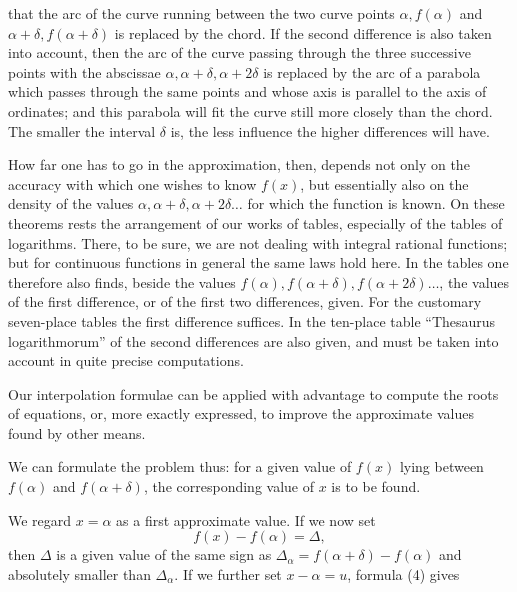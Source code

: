that the arc of the curve running between the two curve points $\alpha, f(\alpha)$ and
$\alpha + \delta, f(\alpha + \delta)$ is replaced by the chord. If the second difference is
also taken into account, then the arc of the curve passing through the three successive
points with the abscissae $\alpha, \alpha + \delta,
\alpha + 2\delta$ is replaced by the arc of a parabola
which passes through the same points and whose axis is parallel to the axis of ordinates;
and this parabola will fit the curve still more closely than the chord.
The smaller the interval $\delta$ is, the less influence the higher
differences will have.

How far one has to go in the approximation, then, depends not only on the
accuracy with which one wishes to know $f(x)$, but essentially also
on the density of the values $\alpha, \alpha + \delta, \alpha + 2\delta
\ldots$ for which the function is known. On these theorems rests the
arrangement of our works of tables, especially of the tables of logarithms. There, to be
sure, we are not dealing with integral rational functions; but for
continuous functions in general the same laws hold here. In the tables
one therefore also finds, beside the values $f(\alpha), f(\alpha + \delta),
f(\alpha + 2\delta) \ldots$, the values of the first difference, or of the first two
differences, given. For the customary seven-place tables the
first difference suffices. In the ten-place table ``Thesaurus
logarithmorum'' of  the second differences are also
given, and must be taken into account in quite precise computations.

Our interpolation formulae can be applied with advantage to compute the roots
of equations, or, more exactly expressed, to improve the approximate values
found by other means.

We can formulate the problem thus: for a given value of $f(x)$ lying between
$f(\alpha)$ and $f(\alpha + \delta)$, the
corresponding value of $x$ is to be found.

We regard $x = \alpha$ as a first approximate value. If we now set
\[
f(x) - f(\alpha) = \varDelta,
\]
then $\varDelta$ is a given value of the same sign as
$\varDelta_\alpha = f(\alpha + \delta) - f(\alpha)$ and absolutely smaller than
$\varDelta_\alpha$. If we further set $x - \alpha = u$, formula (4) gives
